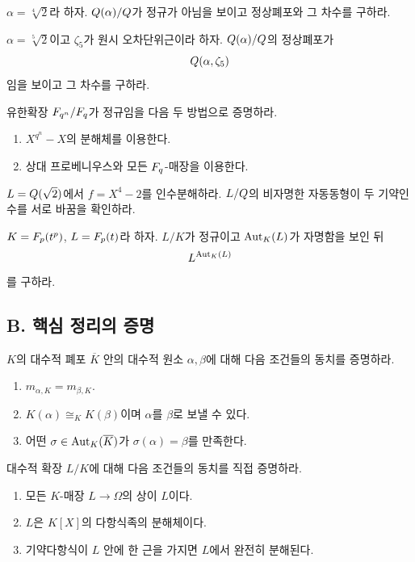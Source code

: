 \begin{exercise}
$\alpha=\sqrt[4]{2}$라 하자. $Q(\alpha)/Q$가 정규가 아님을 보이고 정상폐포와 그 차수를 구하라.
\end{exercise}

\begin{exercise}[*]
$\alpha=\sqrt[5]{2}$이고 $\zeta_5$가 원시 오차단위근이라 하자. $Q(\alpha)/Q$의 정상폐포가
\[
  Q(\alpha,\zeta_5)
\]
임을 보이고 그 차수를 구하라.
\end{exercise}

\begin{exercise}
유한확장 $F_{q^n}/F_q$가 정규임을 다음 두 방법으로 증명하라.
\begin{enumerate}[label=(\alph*)]
  \item $X^{q^n}-X$의 분해체를 이용한다.
  \item 상대 프로베니우스와 모든 $F_q$-매장을 이용한다.
\end{enumerate}
\end{exercise}

\begin{exercise}[*]
$L=Q(\sqrt2)$에서 $f=X^4-2$를 인수분해하라. $L/Q$의 비자명한 자동동형이 두 기약인수를 서로 바꿈을 확인하라.
\end{exercise}

\begin{exercise}
$K=F_p(t^p)$, $L=F_p(t)$라 하자. $L/K$가 정규이고 $\operatorname{Aut}_K(L)$가 자명함을 보인 뒤
\[
  L^{\operatorname{Aut}_K(L)}
\]
를 구하라.
\end{exercise}

\subsection*{B. 핵심 정리의 증명}

\begin{exercise}[*]
$K$의 대수적 폐포 $\overline K$ 안의 대수적 원소 $\alpha,\beta$에 대해 다음 조건들의 동치를 증명하라.
\begin{enumerate}[label=(\roman*)]
  \item $m_{\alpha,K}=m_{\beta,K}$.
  \item $K(\alpha)\cong_K K(\beta)$이며 $\alpha$를 $\beta$로 보낼 수 있다.
  \item 어떤 $\sigma\in\operatorname{Aut}_K(\overline K)$가 $\sigma(\alpha)=\beta$를 만족한다.
\end{enumerate}
\end{exercise}

\begin{exercise}
대수적 확장 $L/K$에 대해 다음 조건들의 동치를 직접 증명하라.
\begin{enumerate}[label=(\roman*)]
  \item 모든 $K$-매장 $L\to\Omega$의 상이 $L$이다.
  \item $L$은 $K[X]$의 다항식족의 분해체이다.
  \item 기약다항식이 $L$ 안에 한 근을 가지면 $L$에서 완전히 분해된다.
\end{enumerate}
\end{exercise}

